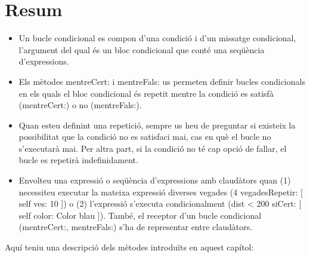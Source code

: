 \section{Resum}

\begin{itemize}
\item Un bucle condicional es compon d'una condició i d'un missatge condicional, l'argument del qual és un bloc condicional que conté una seqüència d'expressions.
\item Els mètodes \textsf{mentreCert:} i \textsf{mentreFals:} us permeten definir bucles condicionals en els quals el bloc condicional és repetit mentre la condició es satisfà (\textsf{mentreCert:}) o no (\textsf{mentreFals:}).
\item Quan esteu definint una repetició, sempre us heu de preguntar si existeix la possibilitat que la condició no es satisfaci mai, cas en què el bucle no s'executarà mai. Per altra part, si la condició no té cap opció de fallar, el bucle es repetirà indefinidament.
\item Envolteu una expressió o seqüència d'expressions amb claudàtors quan (1) necessiteu executar la mateixa expressió diverses vegades (\textsf{4 vegadesRepetir: [ self ves: 10 ]}) o (2) l'expressió s'executa condicionalment (\textsf{dist \textless \hspace*{1mm} 200 siCert: [  self color: Color blau  ]}). També, el receptor d'un bucle condicional (\textsf{mentreCert:}, \textsf{mentreFals:}) s'ha de representar entre claudàtors.
\end{itemize}

\noindent
Aquí teniu una descripció dels mètodes introduïts en aquest capítol:  

